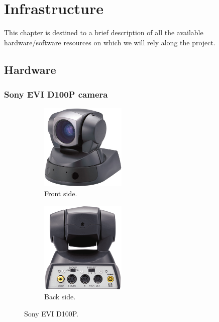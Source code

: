 \chapter{Infrastructure}

	This chapter is destined to a brief description of all the available hardware/software resources on which we will rely along the project.\\
 
\section{Hardware}
	\subsection{Sony EVI D100P camera}
	\label{sec:3_ptz}
		\begin{figure}[h]
			\centering
			\begin{subfigure}[h]{0.4\linewidth}
				\centering
				\includegraphics[width=1.6in]{images/ptz_front}
				\caption{Front side.}
			\end{subfigure}
			\qquad
			\begin{subfigure}[h]{0.4\linewidth}
				\centering
				\includegraphics[width=1.6in]{images/ptz_back}
				\caption{Back side.}
			\end{subfigure}
			\caption{Sony EVI D100P.}
			\label{fig:3_evi}
		\end{figure} 
		
